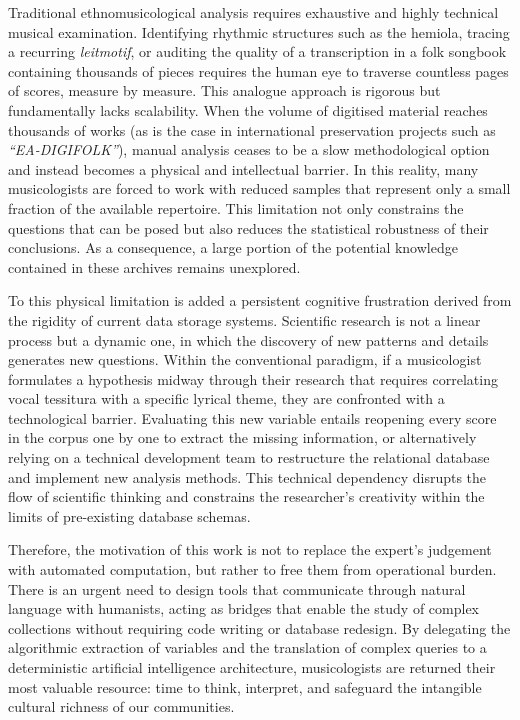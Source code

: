 Traditional ethnomusicological analysis requires exhaustive and highly technical musical examination. Identifying rhythmic structures such as the hemiola, tracing a recurring \textit{leitmotif}, or auditing the quality of a transcription in a folk songbook containing thousands of pieces requires the human eye to traverse countless pages of scores, measure by measure. This analogue approach is rigorous but fundamentally lacks scalability. When the volume of digitised material reaches thousands of works (as is the case in international preservation projects such as \textit{``EA-DIGIFOLK''}), manual analysis ceases to be a slow methodological option and instead becomes a physical and intellectual barrier. In this reality, many musicologists are forced to work with reduced samples that represent only a small fraction of the available repertoire. This limitation not only constrains the questions that can be posed but also reduces the statistical robustness of their conclusions. As a consequence, a large portion of the potential knowledge contained in these archives remains unexplored.

To this physical limitation is added a persistent cognitive frustration derived from the rigidity of current data storage systems. Scientific research is not a linear process but a dynamic one, in which the discovery of new patterns and details generates new questions. Within the conventional paradigm, if a musicologist formulates a hypothesis midway through their research that requires correlating vocal tessitura with a specific lyrical theme, they are confronted with a technological barrier. Evaluating this new variable entails reopening every score in the corpus one by one to extract the missing information, or alternatively relying on a technical development team to restructure the relational database and implement new analysis methods. This technical dependency disrupts the flow of scientific thinking and constrains the researcher’s creativity within the limits of pre-existing database schemas.

Therefore, the motivation of this work is not to replace the expert’s judgement with automated computation, but rather to free them from operational burden. There is an urgent need to design tools that communicate through natural language with humanists, acting as bridges that enable the study of complex collections without requiring code writing or database redesign. By delegating the algorithmic extraction of variables and the translation of complex queries to a deterministic artificial intelligence architecture, musicologists are returned their most valuable resource: time to think, interpret, and safeguard the intangible cultural richness of our communities.


